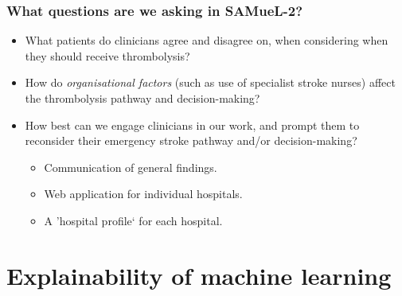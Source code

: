 \documentclass[xcolor={usenames,dvipsnames}]{beamer}
\newcommand{\smallurl}[1]{\textcolor{blue}{\fontsize{4pt}{4.8pt}\selectfont \url{#1}}}
\begin{document}
\begin{frame}
\frametitle{What questions are we asking in SAMueL-2?}
\begin{itemize}
    \setlength\itemsep{5mm}
    \item What patients do clinicians agree and disagree on, when considering when they should receive thrombolysis?
    \item How do \emph{organisational factors} (such as use of specialist stroke nurses) affect the thrombolysis pathway and decision-making?
    \item How best can we engage clinicians in our work, and prompt them to reconsider their emergency stroke pathway and/or decision-making?
    
    \begin{itemize}
        \item Communication of general findings.
        \item Web application for individual hospitals.
        \item A 'hospital profile` for each hospital.
    \end{itemize}
\end{itemize}

\end{frame}


\section{Explainability of machine learning}





\end{document}
